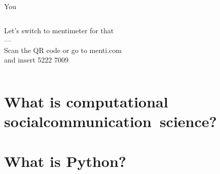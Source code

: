 \documentclass[compress]{beamer}
\begin{document}
\begin{frame}{You}
	\begin{columns}
		Let's switch to mentimeter for that\\
		---\\
		Scan the QR code or go to menti.com\\ 
		and insert 5222 7009
	\end{columns}
\end{frame}



\section[What is CSS\textbar CCS?]{What is computational \lbrack social\textbar communication\rbrack  ~science?}



\section{What is Python?}


\end{document}
